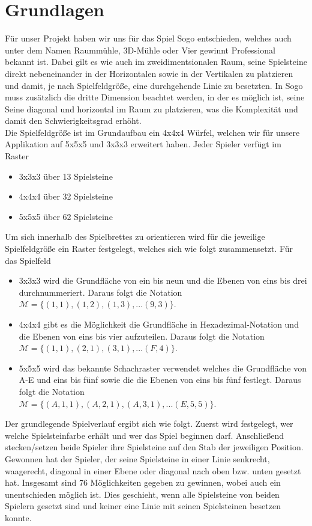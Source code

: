 \documentclass[a4paper]{scrartcl}
\begin{document}
\section{Grundlagen}\label{Grundlagen}
Für unser Projekt haben wir uns für das Spiel Sogo entschieden, welches auch unter dem Namen Raummühle, 3D-Mühle oder Vier gewinnt Professional bekannt ist. Dabei gilt es wie auch im zweidimentsionalen Raum, seine Spielsteine direkt nebeneinander in der Horizontalen sowie in der Vertikalen zu platzieren und damit, je nach Spielfeldgröße, eine durchgehende Linie zu besetzten. In Sogo muss zusätzlich die dritte Dimension beachtet werden, in der es möglich ist, seine Seine diagonal und horizontal im Raum zu platzieren, was die Komplexität und damit den Schwierigkeitsgrad erhöht.
\\
Die Spielfeldgröße ist im Grundaufbau ein 4x4x4 Würfel, welchen wir für unsere Applikation auf 5x5x5 und 3x3x3 erweitert haben. 
Jeder Spieler verfügt im Raster
	\begin{itemize}
		\item 3x3x3 über 13 Spielsteine
		\item 4x4x4 über 32 Spielsteine		
		\item 5x5x5 über 62 Spielsteine
	\end{itemize}
Um sich innerhalb des Spielbrettes zu orientieren wird für die jeweilige Spielfeldgröße ein Raster festgelegt, welches sich wie folgt zusammensetzt. 
Für das Spielfeld
\begin{itemize}
		\item 3x3x3 wird die Grundfläche von ein bis neun und die Ebenen von 		eins bis drei durchnummeriert. Daraus folgt die Notation \\ $\mathcal{M}=\{(1,1),(1,2),(1,3),...(9,3)\}$.
		\item 4x4x4 gibt es die Möglichkeit die Grundfläche in Hexadezimal-Notation und die Ebenen von eins bis vier aufzuteilen. Daraus folgt die Notation \\
$\mathcal{M}=\{(1,1),(2,1),(3,1),...(F,4)\}$.
		\item 5x5x5 wird das bekannte Schachraster verwendet welches die Grundfläche von A-E und eins bis fünf sowie die die Ebenen von eins bis fünf festlegt. Daraus folgt die Notation \\
$\mathcal{M}=\{(A,1,1),(A,2,1),(A,3,1),...(E,5,5)\}$.
	\end{itemize}
	
Der grundlegende Spielverlauf ergibt sich wie folgt. Zuerst wird festgelegt, wer welche Spielsteinfarbe erhält und wer das Spiel beginnen darf. Anschließend stecken/setzen beide Spieler ihre Spielsteine auf den Stab der jeweiligen Position. Gewonnen hat der Spieler, der seine Spielsteine in einer Linie senkrecht, waagerecht, diagonal in einer Ebene oder diagonal nach oben bzw. unten gesetzt hat. Insgesamt sind 76 Möglichkeiten gegeben zu gewinnen, wobei auch ein unentschieden möglich ist. Dies geschieht, wenn alle Spielsteine von beiden Spielern gesetzt sind und keiner eine Linie mit seinen Spielsteinen besetzen konnte.
\end{document}
